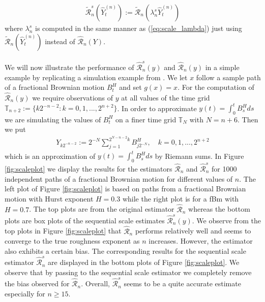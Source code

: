 \documentclass{article}
\begin{document}
\begin{align*}
\widetilde{\mathscr{R}}_n^s (\widehat{Y}_t^{(n)}) := \widetilde{\mathscr{R}}_n (\lambda_n^s \widehat{Y}_t^{(n)})
\end{align*} 
where $\lambda_n^s$ is computed in the same manner as (\ref{eq:scale_lambda}) just using $\widetilde{\mathscr{R}}_n(\widehat{Y}_t^{(n)})$ instead of $\widehat{\mathscr{R}}_n(Y)$.\\\\
We will now illustrate the performance of $\hat{\mathscr{R}}_n^s (y)$ and $\hat{\mathscr{R}}_n (y)$ in a simple example by replicating a simulation example from \cite{han}. We let $x$ follow a sample path of a fractional Brownian motion $B^H_t$ and set $g(x)=x$. For the computation of $\hat{\mathscr{R}}_n (y)$ we require observations of $y$ at all values of the time grid $\mathbb{T}_{n+2}:= \{k 2^{-n-2} : k=0,1,...,2^{n+2}\}$. In order to approximate $y(t)=\int_0^t B^H_s ds$ we are simulating the values of $B^H_t$ on a finer time grid $\mathbb{T}_N$ with $N=n+6$. Then we put
\begin{align}
Y_{k2^{-n-2}}:= 2^{-N} \sum_{j=1}^{2^{N-n-2}k} B^H_{j2^{-N}}, \quad k=0,1,...,2^{n+2} \label{eq:scaley}
\end{align}
which is an approximation of $y(t)=\int_0^t B^H_s ds$ by Riemann sums. In Figure \ref{fig:scaleplot} we display the results for the estimators $\hat{\mathscr{R}}_n $ and $\hat{\mathscr{R}}_n^s $ for 1000 independent paths of a fractional Brownian motion for different values of $n$. The left plot of Figure \ref{fig:scaleplot} is based on paths from a fractional Brownian motion with Hurst exponent $H=0.3$ while the right plot is for a fBm with $H=0.7$. The top plots are from the original estimator $\hat{\mathscr{R}}_n$ whereas the bottom plots are box plots of the sequential scale estimates $\hat{\mathscr{R}}_n^s (y)$. We observe from the top plots in Figure \ref{fig:scaleplot} that $\hat{\mathscr{R}}_n$ performs relatively well and seems to converge to the true roughness exponent as $n$ increases. However, the estimator also exhibits a certain bias. The corresponding results for the sequential scale estimator $\hat{\mathscr{R}}_n^s$ are displayed in the bottom plots of Figure \ref{fig:scaleplot}. We observe that by passing to the sequential scale estimator we completely remove the bias observed for $\hat{\mathscr{R}}_n$. Overall, $\hat{\mathscr{R}}_n^s $ seems to be a quite accurate estimate especially for $n\geq 15$. 
\end{document}
